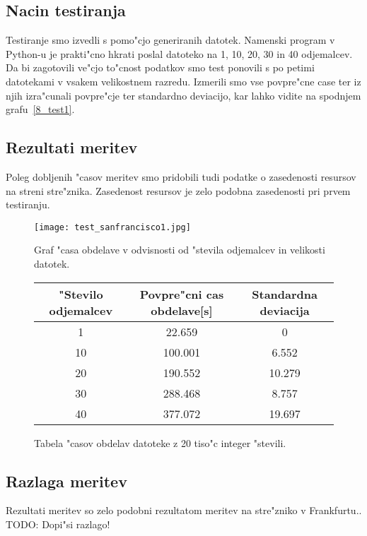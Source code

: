 \subsection{Nacin testiranja}
Testiranje smo izvedli s pomo"cjo generiranih datotek. Namenski program v Python-u je prakti"cno hkrati poslal datoteko na 1, 10, 20, 30 in 40 odjemalcev. Da bi zagotovili ve"cjo to"cnost podatkov smo test ponovili s po petimi datotekami v vsakem velikostnem razredu. 
Izmerili smo vse povpre"cne case ter iz njih izra"cunali povpre"cje ter standardno deviacijo, kar lahko vidite na spodnjem grafu~\ref{8_test1}.

\subsection{Rezultati meritev}
Poleg dobljenih "casov meritev smo pridobili tudi podatke o zasedenosti resursov na streni stre"znika. Zasedenost resursov je zelo podobna zasedenosti pri prvem testiranju. 


\begin{figure}
  \centering
    \texttt{[image: test\_sanfrancisco1.jpg]}
  \caption{Graf "casa obdelave v odvisnosti od "stevila odjemalcev in velikosti datotek.}
  \label{8_graph_sanfrancisco1}
\end{figure}



\begin{figure}[!htbp]
  \centering
  \begin{tabular}{ | c | c | c | }
    \hline
    "Stevilo odjemalcev & Povpre"cni cas obdelave[s] & Standardna deviacija\\ \hline
    1 & 22.659     & 0 \\ \hline
    10 & 100.001 & 6.552\\ \hline
    20 & 190.552 & 10.279\\ \hline
    30 & 288.468 & 8.757\\ \hline
    40 & 377.072 & 19.697\\ \hline
  \end{tabular}
  \caption{Tabela "casov obdelav datoteke z 20 tiso"c integer "stevili.}
  \label{8_table_sanfrancisco1}
  \centering
\end{figure}


\subsection{Razlaga meritev}
Rezultati meritev so zelo podobni rezultatom meritev na stre"zniko v Frankfurtu..
TODO: Dopi"si razlago!


